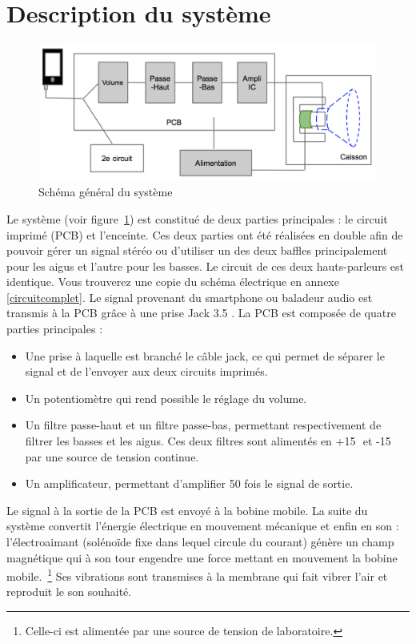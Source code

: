\section{Description du système}

\begin{figure}[h]
\begin{center}
\includegraphics[width=\textwidth]{img/schemacomplet} 
\end{center}
\caption{Schéma général du système}		
\label{fig:schemacomplet}		
\end{figure}

Le système (voir figure~\ref{fig:schemacomplet}) est constitué de deux parties principales : le circuit imprimé (PCB) et l'enceinte. 
Ces deux parties ont été réalisées en double afin de pouvoir gérer un signal stéréo ou d'utiliser un des deux baffles principalement pour les aigus et l'autre pour les basses. Le circuit de ces deux hauts-parleurs est identique. Vous trouverez une copie du schéma électrique en annexe \ref{circuitcomplet}.
Le signal provenant du smartphone ou baladeur audio est transmis à la PCB grâce à une prise Jack 3.5 \milli\meter.
La PCB est composée de quatre parties principales :
\begin{itemize}
\item Une prise à laquelle est branché le câble jack, ce qui permet de séparer le signal et de l'envoyer aux deux circuits imprimés.
\item Un potentiomètre qui rend possible le réglage du volume.
\item Un filtre passe-haut et un filtre passe-bas, permettant respectivement de filtrer les basses et les aigus. Ces deux filtres sont alimentés en +15\,\volt \, et -15\,\volt \, par une source de tension continue.
\item Un amplificateur, permettant d'amplifier 50 fois le signal de sortie.
\end{itemize}
Le signal à la sortie de la PCB est envoyé à la bobine mobile. La suite du système convertit l'énergie électrique en mouvement mécanique et enfin en son : 
l'électroaimant (solénoïde fixe dans lequel circule du courant) génère un champ magnétique qui à son tour engendre une force mettant en mouvement la bobine mobile.~\footnote{Celle-ci est alimentée par une source de tension de laboratoire.}
Ses vibrations sont transmises à la membrane qui fait vibrer l'air et reproduit le son souhaité.

